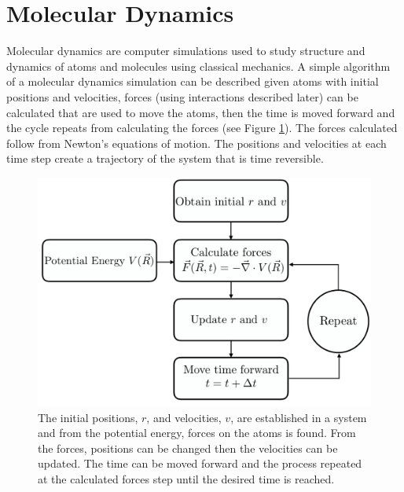 \section{Molecular Dynamics}
Molecular dynamics are computer simulations used to study structure and dynamics of atoms and molecules using classical mechanics. 
A simple algorithm of a molecular dynamics simulation can be described given atoms with initial positions and velocities, forces (using interactions described later) can be calculated that are used to move the atoms, then the time is moved forward and the cycle repeats from calculating the forces (see Figure \ref{fig:MDschematic}). The forces calculated follow from Newton's equations of motion. The positions and velocities at each time step create a trajectory of the system that is time reversible. 

\begin{figure}
    \includegraphics[scale=0.45]{figures/MDschematic.pdf}
    \caption{The initial positions, $r$, and velocities, $v$, are established in a system and from the potential energy, forces on the atoms is found. From the forces, positions can be changed then the velocities can be updated. The time can be moved forward and the process repeated at the calculated forces step until the desired time is reached.}
    \label{fig:MDschematic}
\end{figure}

